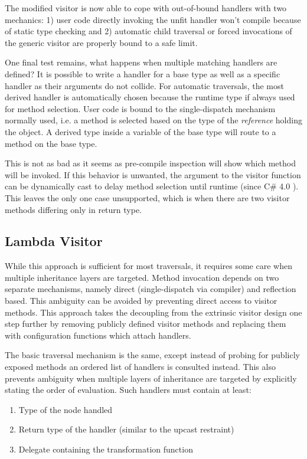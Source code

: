 \documentclass[twoside,openright]{uva-bachelor-thesis}
\begin{document}
			The modified visitor is now able to cope with out-of-bound handlers with two mechanics: 1) user code directly invoking the unfit handler won't compile because of static type checking and 2) automatic child traversal or forced invocations of the generic visitor are properly bound to a safe limit.
			
			One final test remains, what happens when multiple matching handlers are defined? It is possible to write a handler for a base type as well as a specific handler as their arguments do not collide. For automatic traversals, the most derived handler is automatically chosen because the runtime type if always used for method selection. User code is bound to the single-dispatch mechanism normally used, i.e. a method is selected based on the type of the \emph{reference} holding the object. A derived type inside a variable of the base type will route to a method on the base type.
			
			This is not as bad as it seems as pre-compile inspection will show which method will be invoked. If this behavior is unwanted, the argument to the visitor function can be dynamically cast to delay method selection until runtime (since C\# 4.0 \cite{schildt2010c}). This leaves the only one case unsupported, which is when there are two visitor methods differing only in return type.
			
		\subsection{Lambda Visitor}
			While this approach is sufficient for most traversals, it requires some care when multiple inheritance layers are targeted. Method invocation depends on two separate mechanisms, namely direct (single-dispatch via compiler) and reflection based. This ambiguity can be avoided by preventing direct access to visitor methods. This approach takes the decoupling from the extrinsic visitor design one step further by removing publicly defined visitor methods and replacing them with configuration functions which attach handlers.
			
			The basic traversal mechanism is the same, except instead of probing for publicly exposed methods an ordered list of handlers is consulted instead. This also prevents ambiguity when multiple layers of inheritance are targeted by explicitly stating the order of evaluation. Such handlers must contain at least:
			\begin{enumerate}
				\item Type of the node handled
				\item Return type of the handler (similar to the upcast restraint)
				\item Delegate containing the transformation function
			\end{enumerate}
			
\end{document}
